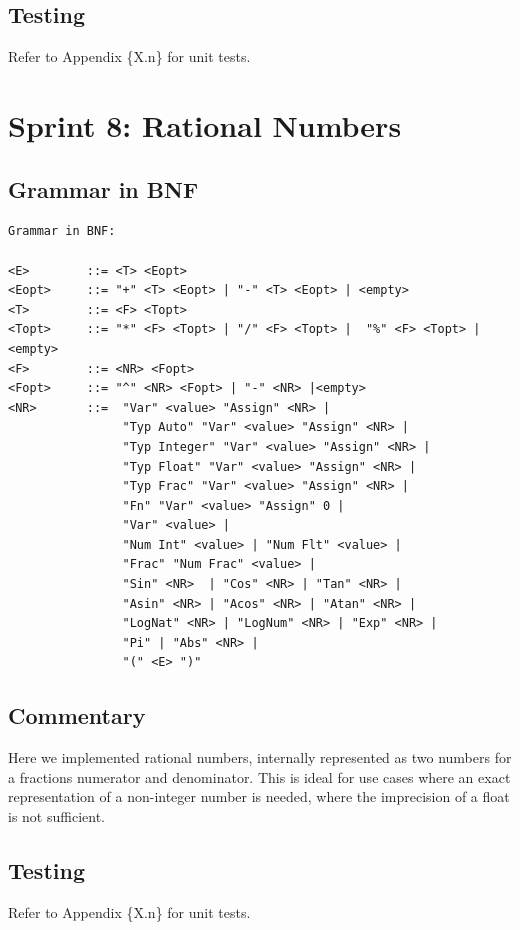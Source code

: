 \documentclass[a4paper, oneside, 11pt]{report}
\begin{document}
	\subsection{Testing}
	Refer to Appendix \{X.n\} for unit tests.

	\clearpage
	\section{Sprint 8: Rational Numbers}
	\subsection{Grammar in BNF}
	\begin{verbatim}
Grammar in BNF:

<E>        ::= <T> <Eopt>
<Eopt>     ::= "+" <T> <Eopt> | "-" <T> <Eopt> | <empty>
<T>        ::= <F> <Topt>
<Topt>     ::= "*" <F> <Topt> | "/" <F> <Topt> |  "%" <F> <Topt> |<empty>
<F>        ::= <NR> <Fopt>
<Fopt>     ::= "^" <NR> <Fopt> | "-" <NR> |<empty>
<NR>       ::=  "Var" <value> "Assign" <NR> |
                "Typ Auto" "Var" <value> "Assign" <NR> |
                "Typ Integer" "Var" <value> "Assign" <NR> |
                "Typ Float" "Var" <value> "Assign" <NR> |
                "Typ Frac" "Var" <value> "Assign" <NR> |
                "Fn" "Var" <value> "Assign" 0 |
                "Var" <value> |
                "Num Int" <value> | "Num Flt" <value> |
                "Frac" "Num Frac" <value> |
                "Sin" <NR>  | "Cos" <NR> | "Tan" <NR> |
                "Asin" <NR> | "Acos" <NR> | "Atan" <NR> |
                "LogNat" <NR> | "LogNum" <NR> | "Exp" <NR> |
                "Pi" | "Abs" <NR> |
                "(" <E> ")"
	\end{verbatim}
	\subsection{Commentary}
	Here we implemented rational numbers, internally represented as two numbers for a fractions numerator and denominator. This is ideal for use cases where an exact representation of a non-integer number is needed, where the imprecision of a float is not sufficient.

	\subsection{Testing}
	Refer to Appendix \{X.n\} for unit tests.
\end{document}
